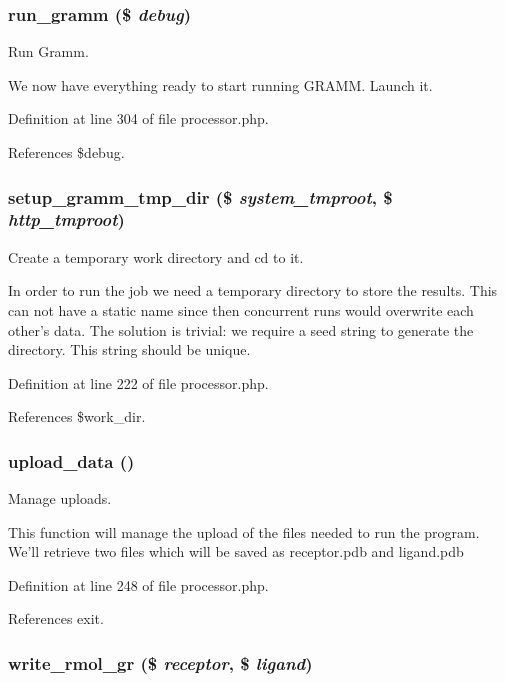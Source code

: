 \subsubsection{\setlength{\rightskip}{0pt plus 5cm}run\_\-gramm (\$ {\em debug})}\label{processor_8php_a16}


Run Gramm. 

We now have everything ready to start running GRAMM. Launch it. 

Definition at line 304 of file processor.php.

References \$debug.
\subsubsection{\setlength{\rightskip}{0pt plus 5cm}setup\_\-gramm\_\-tmp\_\-dir (\$ {\em system\_\-tmproot}, \$ {\em http\_\-tmproot})}\label{processor_8php_a14}


Create a temporary work directory and cd to it. 

In order to run the job we need a temporary directory to store the results. This can not have a static name since then concurrent runs would overwrite each other's data. The solution is trivial: we require a seed string to generate the directory. This string should be unique. 

Definition at line 222 of file processor.php.

References \$work\_\-dir.
\subsubsection{\setlength{\rightskip}{0pt plus 5cm}upload\_\-data ()}\label{processor_8php_a15}


Manage uploads. 

This function will manage the upload of the files needed to run the program. We'll retrieve two files which will be saved as receptor.pdb and ligand.pdb 

Definition at line 248 of file processor.php.

References exit.
\subsubsection{\setlength{\rightskip}{0pt plus 5cm}write\_\-rmol\_\-gr (\$ {\em receptor}, \$ {\em ligand})}\label{processor_8php_a11}


